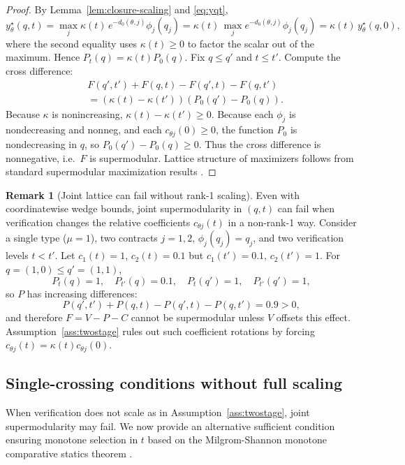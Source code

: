 \documentclass[final,3p,times]{elsarticle}
\theoremstyle{plain}
\theoremstyle{definition}
\newtheorem{remark}{Remark}
\newcommand{\1}{\mathbbm{1}}
\begin{document}
\begin{proof}
By Lemma~\ref{lem:closure-scaling} and \eqref{eq:yqt},
\[
y^\star_\theta(q,t)=\max_j \kappa(t)\,e^{-d_0(\theta,j)}\phi_j(q_j)=\kappa(t)\,\max_j e^{-d_0(\theta,j)}\phi_j(q_j)=\kappa(t)\,y^\star_\theta(q,0),
\]
where the second equality uses $\kappa(t)\ge 0$ to factor the scalar out of the maximum.
Hence $P_t(q)=\kappa(t)P_0(q)$. Fix $q\le q'$ and $t\le t'$. Compute the cross difference:
\[
\begin{aligned}
&F(q',t')+F(q,t)-F(q',t)-F(q,t') \\
&= (\kappa(t)-\kappa(t'))(P_0(q')-P_0(q)).
\end{aligned}
\]
Because $\kappa$ is nonincreasing, $\kappa(t)-\kappa(t')\ge 0$. Because each $\phi_j$ is nondecreasing and nonneg, and each $c_{\theta j}(0)\ge 0$, the function $P_0$ is nondecreasing in $q$, so $P_0(q')-P_0(q)\ge 0$. Thus the cross difference is nonnegative, i.e.\ $F$ is supermodular. Lattice structure of maximizers follows from standard supermodular maximization results \citep{Topkis1998}.
\end{proof}

\begin{remark}[Joint lattice can fail without rank-1 scaling]\label{rem:scaling-fail}
Even with coordinatewise wedge bounds, joint supermodularity in $(q,t)$ can fail when verification changes the relative coefficients $c_{\theta j}(t)$ in a non-rank-1 way. Consider a single type ($\mu=1$), two contracts $j=1,2$, $\phi_j(q_j)=q_j$, and two verification levels $t<t'$. Let $c_{1}(t)=1$, $c_{2}(t)=0.1$ but $c_{1}(t')=0.1$, $c_{2}(t')=1$. For $q=(1,0)\le q'=(1,1)$,
\[
P_t(q)=1,\quad P_{t'}(q)=0.1,\quad P_t(q')=1,\quad P_{t'}(q')=1,
\]
so $P$ has increasing differences:
\[
P(q',t')+P(q,t)-P(q',t)-P(q,t')=0.9>0,
\]
and therefore $F=V-P-C$ cannot be supermodular unless $V$ offsets this effect. Assumption~\ref{ass:twostage} rules out such coefficient rotations by forcing $c_{\theta j}(t)=\kappa(t)c_{\theta j}(0)$.
\end{remark}

\subsection{Single-crossing conditions without full scaling}

When verification does not scale as in Assumption~\ref{ass:twostage}, joint supermodularity may fail. We now provide an alternative sufficient condition ensuring monotone selection in $t$ based on the Milgrom-Shannon monotone comparative statics theorem \citep{MilgromShannon1994}.
\end{document}

